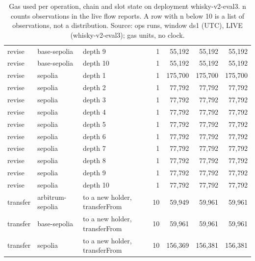 \begin{table}[htbp]
\begin{tabular}{lllrrrr}
    revise & base-sepolia & depth 9 & 1 & 55,192 & 55,192 & 55,192 \\
    revise & base-sepolia & depth 10 & 1 & 55,192 & 55,192 & 55,192 \\
    revise & sepolia & depth 1 & 1 & 175,700 & 175,700 & 175,700 \\
    revise & sepolia & depth 2 & 1 & 77,792 & 77,792 & 77,792 \\
    revise & sepolia & depth 3 & 1 & 77,792 & 77,792 & 77,792 \\
    revise & sepolia & depth 4 & 1 & 77,792 & 77,792 & 77,792 \\
    revise & sepolia & depth 5 & 1 & 77,792 & 77,792 & 77,792 \\
    revise & sepolia & depth 6 & 1 & 77,792 & 77,792 & 77,792 \\
    revise & sepolia & depth 7 & 1 & 77,792 & 77,792 & 77,792 \\
    revise & sepolia & depth 8 & 1 & 77,792 & 77,792 & 77,792 \\
    revise & sepolia & depth 9 & 1 & 77,792 & 77,792 & 77,792 \\
    revise & sepolia & depth 10 & 1 & 77,792 & 77,792 & 77,792 \\
    transfer & arbitrum-sepolia & to a new holder, transferFrom & 10 & 59,949 & 59,961 & 59,961 \\
    transfer & base-sepolia & to a new holder, transferFrom & 10 & 59,961 & 59,961 & 59,961 \\
    transfer & sepolia & to a new holder, transferFrom & 10 & 156,369 & 156,381 & 156,381 \\
    \bottomrule
    \end{tabular}
    \caption{Gas used per operation, chain and slot state on deployment whisky-v2-eval3. n counts observations in the live flow reports. A row with n below 10 is a list of observations, not a distribution. Source: ops runs, window ds1 (UTC), LIVE (whisky-v2-eval3); gas units, no clock.}
    \label{tab:gas-per-operation-ops}
\end{table}
